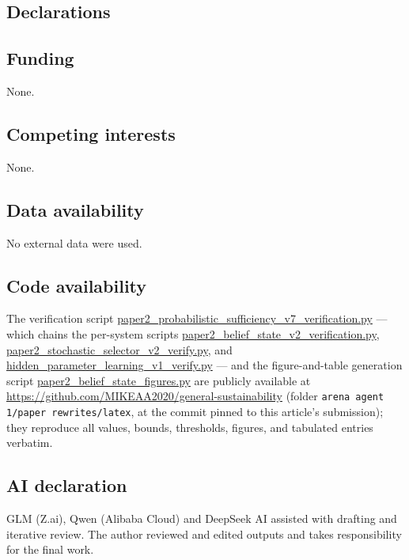 \documentclass[10pt,twocolumn]{article}
\theoremstyle{plain}
\theoremstyle{definition}
\theoremstyle{remark}
\begin{document}
\subsection*{Declarations}

\subsection*{Funding}
None.

\subsection*{Competing interests}
None.

\subsection*{Data availability}
No external data were used.

\subsection*{Code availability}
The verification script
\url{paper2_probabilistic_sufficiency_v7_verification.py} --- which chains
the per-system scripts \url{paper2_belief_state_v2_verification.py},
\url{paper2_stochastic_selector_v2_verify.py}, and
\url{hidden_parameter_learning_v1_verify.py} --- and the figure-and-table
generation script \url{paper2_belief_state_figures.py} are publicly
available at \url{https://github.com/MIKEAA2020/general-sustainability}
(folder \texttt{arena agent 1/paper rewrites/latex}, at the commit
pinned to this article's submission); they reproduce all values, bounds,
thresholds, figures, and tabulated entries verbatim.

\subsection*{AI declaration}
GLM (Z.ai), Qwen (Alibaba Cloud) and DeepSeek AI assisted with drafting
and iterative review. The author reviewed and edited outputs and takes
responsibility for the final work.
\end{document}
